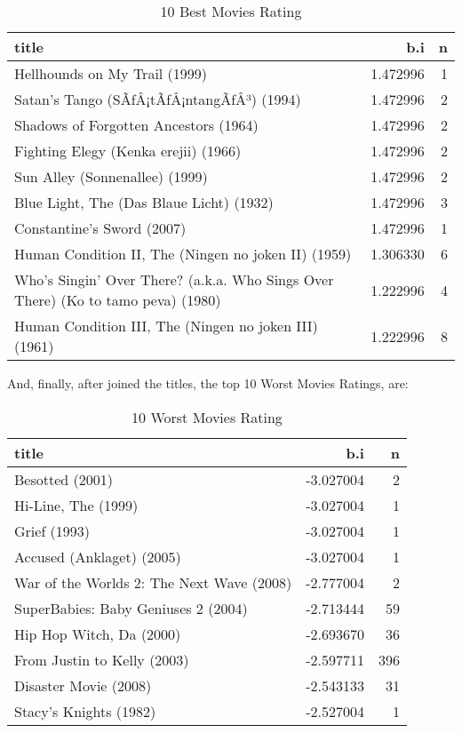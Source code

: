 \documentclass[]{article}
\begin{document}
\begin{table}[!h]

\caption{\label{tab:movies.top10.movies.rating}10 Best Movies Rating}
\centering
\begin{tabular}{lrr}
\toprule
title & b.i & n\\
\midrule
\rowcolor{gray!6}  Hellhounds on My Trail (1999) & 1.472996 & 1\\
Satan's Tango (SÃƒÂ¡tÃƒÂ¡ntangÃƒÂ³) (1994) & 1.472996 & 2\\
\rowcolor{gray!6}  Shadows of Forgotten Ancestors (1964) & 1.472996 & 2\\
Fighting Elegy (Kenka erejii) (1966) & 1.472996 & 2\\
\rowcolor{gray!6}  Sun Alley (Sonnenallee) (1999) & 1.472996 & 2\\
\addlinespace
Blue Light, The (Das Blaue Licht) (1932) & 1.472996 & 3\\
\rowcolor{gray!6}  Constantine's Sword (2007) & 1.472996 & 1\\
Human Condition II, The (Ningen no joken II) (1959) & 1.306330 & 6\\
\rowcolor{gray!6}  Who's Singin' Over There? (a.k.a. Who Sings Over There) (Ko to tamo peva) (1980) & 1.222996 & 4\\
Human Condition III, The (Ningen no joken III) (1961) & 1.222996 & 8\\
\bottomrule
\end{tabular}
\end{table}

And, finally, after joined the titles, the top 10 Worst Movies Ratings,
are:

\begin{table}[!h]

\caption{\label{tab:movies.10.worst.movies.rating}10 Worst Movies Rating}
\centering
\begin{tabular}{lrr}
\toprule
title & b.i & n\\
\midrule
\rowcolor{gray!6}  Besotted (2001) & -3.027004 & 2\\
Hi-Line, The (1999) & -3.027004 & 1\\
\rowcolor{gray!6}  Grief (1993) & -3.027004 & 1\\
Accused (Anklaget) (2005) & -3.027004 & 1\\
\rowcolor{gray!6}  War of the Worlds 2: The Next Wave (2008) & -2.777004 & 2\\
\addlinespace
SuperBabies: Baby Geniuses 2 (2004) & -2.713444 & 59\\
\rowcolor{gray!6}  Hip Hop Witch, Da (2000) & -2.693670 & 36\\
From Justin to Kelly (2003) & -2.597711 & 396\\
\rowcolor{gray!6}  Disaster Movie (2008) & -2.543133 & 31\\
Stacy's Knights (1982) & -2.527004 & 1\\
\bottomrule
\end{tabular}
\end{table}
\end{document}
